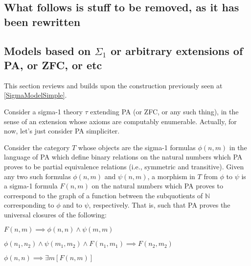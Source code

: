 \subsection{What follows is stuff to be removed, as it has been rewritten}

\subsection{Models based on \texorpdfstring{$\Sigma_1$}{Sigma-1} or arbitrary extensions of PA, or ZFC, or etc}

This section reviews and builds upon the construction previously seen at \cref{SigmaModelSimple}.

\begin{construction}\label{Sigma1ModelScratch}

Consider a sigma-1 theory $\tau$ extending PA (or ZFC, or any such thing), in the sense of an extension whose axioms are computably enumerable. Actually, for now, let's just consider PA simpliciter.


Consider the category $T$ whose objects are the sigma-1 formulas $\phi(n, m)$ in the language of PA which define binary relations on the natural numbers which PA proves to be partial equivalence relations (i.e., symmetric and transitive). Given any two such formulas $\phi(n, m)$ and $\psi(n, m)$, a morphism in $T$ from $\phi$ to $\psi$ is a sigma-1 formula $F(n, m)$ on the natural numbers which PA proves to correspond to the graph of a function between the subquotients of $\mathbb{N}$ corresponding to $\phi$ and to $\psi$, respectively. That is, such that PA proves the universal closures of the following:

$F(n, m) \implies \phi(n, n) \wedge \psi(m, m)$

$\phi(n_1, n_2) \wedge \psi(m_1, m_2) \wedge F(n_1, m_1) \implies F(n_2, m_2)$

$\phi(n, n) \implies \exists m [F(n, m)]$


\end{construction}
